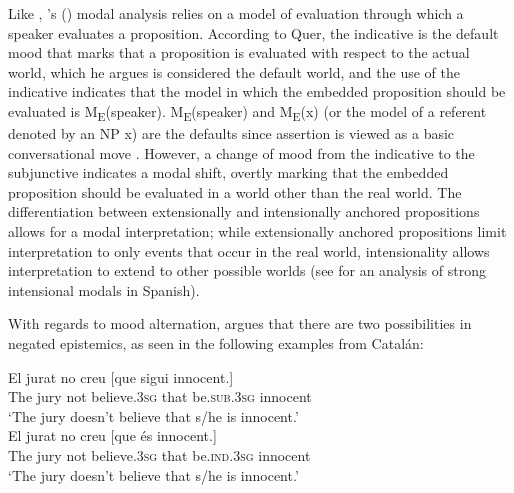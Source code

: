 \documentclass[output=paper,colorlinks,citecolor=brown,
]{langscibook}
\begin{document}
Like \citeauthor{Farkas2003}, \citeauthor{Quer2001}'s (\citeyear{Quer2001}) modal analysis relies on a model of evaluation through which a speaker evaluates a proposition. According to Quer, the indicative is the default mood that marks that a proposition is evaluated with respect to the actual world, which he argues is considered the default world, and the use of the indicative indicates that the model in which the embedded proposition should be evaluated is M\textsubscript{E}(speaker). M\textsubscript{E}(speaker) and M\textsubscript{E}(x) (or the model of a referent denoted by an NP x) are the defaults since assertion is viewed as a basic conversational move \citep[87]{quer1998}. However, a change of mood from the indicative to the subjunctive indicates a modal shift, overtly marking that the embedded proposition should be evaluated in a world other than the real world. The differentiation between extensionally and intensionally anchored propositions allows for a modal interpretation; while extensionally anchored propositions limit interpretation to only events that occur in the real world, intensionality allows interpretation to extend to other possible worlds (see \citealt{Kemchinsky2009} for an analysis of strong intensional modals in Spanish). 



With regards to mood alternation, \citet[91]{Quer2001} argues that there are two possibilities in negated epistemics, as seen in the following examples from Catalán:


\begin{exe} %
    \ex\label{ex:bove:6} 
    \begin{xlist} %
        \ex \label{ex:bove:6a} 
            \gll  El jurat    no creu 	  [que sigui     innocent.]\\  
            The jury not believe.\textsc{3sg} that be.\textsc{sub}.\textsc{3sg} innocent\\%
                   \glt `The jury doesn't believe that s/he is innocent.'\\
        \ex\label{ex:bove:6b} 
            \gll  El jurat    no creu 	  [que és     innocent.]\\
            The jury not believe.\textsc{3sg} that be.\textsc{ind}.\textsc{3sg} innocent\\
                   \glt `The jury doesn't believe that s/he is innocent.'\\
\end{xlist}
\end{exe}
\end{document}
